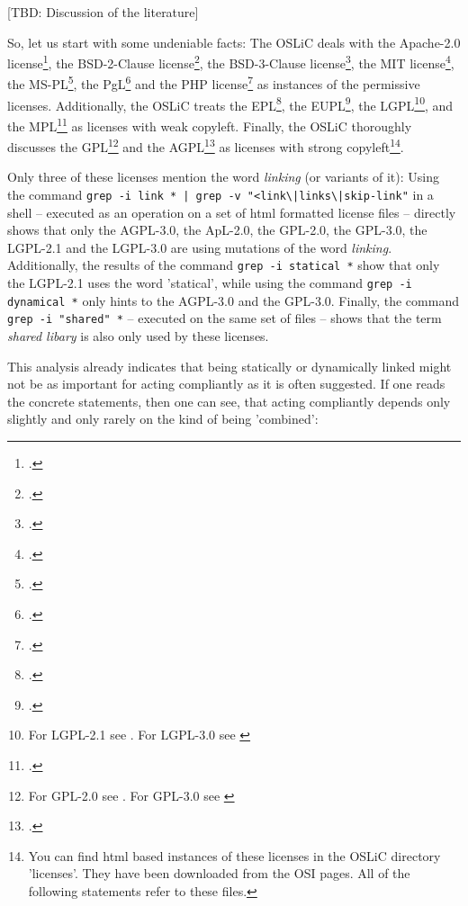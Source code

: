 [TBD: Discussion of the literature]

So, let us start with some undeniable facts: The OSLiC deals with the Apache-2.0
license\footcite [cf.][\nopage wp]{Apl20OsiLicense2004a}, the BSD-2-Clause
license\footcite [cf.][\nopage wp]{BsdLicense2Clause}, the BSD-3-Clause
license\footcite [cf.][\nopage wp]{BsdLicense3Clause}, the MIT license\footcite
[cf.][\nopage wp]{MitLicense2012a}, the MS-PL\footcite[cf.][\nopage
wp]{MsplOsiLicense2013a}, the PgL\footcite[cf.][\nopage wp]{PglOsiLicense2013a}
and the PHP license\footcite[cf.][\nopage wp]{Php30OsiLicense2013a} as instances
of the permissive licenses.
Additionally, the OSLiC treats the EPL\footcite[cf.][\nopage
wp]{Epl10OsiLicense2005a}, the EUPL\footcite[cf.][\nopage
wp]{Eupl11OsiLicense2007a}, the LGPL\footnote{For LGPL-2.1 see \cite
[cf.][\nopage wp]{Lgpl21OsiLicense1999a}. For LGPL-3.0 see \cite [cf.][\nopage
wp]{Lgpl30OsiLicense2007a} }, and the MPL\footcite [cf.][\nopage
wp]{Mpl20OsiLicense2013a} as licenses with weak copyleft. Finally, the OSLiC
thoroughly discusses the GPL\footnote{For GPL-2.0 see \cite [cf.][\nopage
wp]{Gpl20OsiLicense1991a}. For GPL-3.0 see \cite [cf.][\nopage
wp]{Gpl30OsiLicense2007a} } and the AGPL\footcite[cf.][\nopage
wp]{Agpl30OsiLicense2007a} as licenses with strong copyleft\footnote{You can
find html based instances of these licenses in the OSLiC directory 'licenses'.
They have been downloaded from the OSI pages. All of the following statements
refer to these files.}.

Only three of these licenses mention the word \emph{linking} (or variants of
it): Using the command \texttt{grep -i link * | grep -v
"<link\textbackslash{}|links\textbackslash{}|skip-link"} in a shell -- executed
as an operation on a set of html formatted license files -- directly shows that
only the AGPL-3.0, the ApL-2.0, the GPL-2.0, the GPL-3.0, the LGPL-2.1 and the
LGPL-3.0 are using mutations of the word \emph{linking}. Additionally, the
results of the command \texttt{grep -i statical *} show that only the LGPL-2.1
uses the word 'statical', while using the command \texttt{grep -i dynamical *}
only hints to the AGPL-3.0 and the GPL-3.0. Finally, the command \texttt{grep -i
"shared" *} -- executed on the same set of files -- shows that the term
\emph{shared libary} is also only used by these licenses.

This analysis already indicates that being statically or dynamically linked
might not be as important for acting compliantly as it is often suggested.
% 
If one reads the concrete statements, then one can see, that acting compliantly
depends only slightly and only rarely on the kind of being 'combined':

